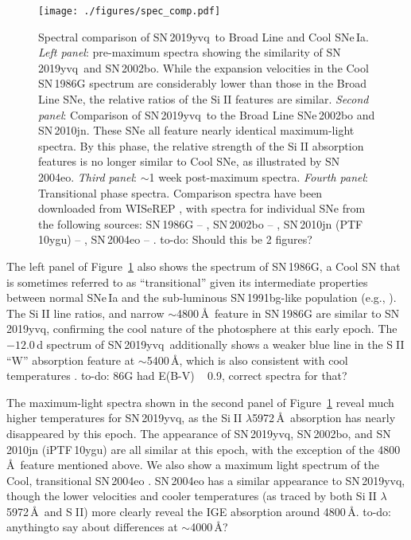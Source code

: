 \documentclass[twocolumn]{aastex63}
\def\ion#1#2{#1$\;${\footnotesize\rm{#2}}\relax}
\newcommand{\todo}[1]{{\color{magenta} to-do: {#1}}}
\newcommand{\sn}{SN\,2019yvq}
\begin{document}
\begin{figure}
    \centering
    \texttt{[image: ./figures/spec\_comp.pdf]}
    \caption{Spectral comparison of \sn\ to \citet{Branch06} Broad Line and
    Cool SNe\,Ia. \textit{Left panel}: pre-maximum spectra showing the
    similarity of \sn\ and SN\,2002bo. While the expansion velocities in the
    Cool SN\,1986G spectrum are considerably lower than those in the Broad
    Line SNe, the relative ratios of the \ion{Si}{II} features are similar.
    \textit{Second panel}: Comparison of \sn\ to the Broad Line SNe\,2002bo
    and SN\,2010jn. These SNe all feature nearly identical maximum-light
    spectra. By this phase, the relative strength of the \ion{Si}{II}
    absorption features is no longer similar to \citet{Branch06} Cool SNe, as
    illustrated by SN\,2004eo. \textit{Third panel}: $\sim$1 week post-maximum
    spectra. \textit{Fourth panel}: Transitional phase spectra. Comparison
    spectra have been downloaded from WISeREP \citep{Yaron12}, with spectra
    for individual SNe from the following sources: SN\,1986G --
    \citet{Cristiani92}, SN\,2002bo -- \citet{Benetti04,Silverman11},
    SN\,2010jn (PTF\,10ygu) -- \citet{Hachinger13,Maguire14}, SN\,2004eo --
    \citet{Pastorello07}. \todo{Should this be 2 figures?}}
    \label{fig:spec_comp}
\end{figure}

The left panel of Figure~\ref{fig:spec_comp} also shows the spectrum of
SN\,1986G, a \citet{Branch06} Cool SN that is sometimes referred to as
``transitional'' given its intermediate properties between normal SNe\,Ia and
the sub-luminous SN\,1991bg-like population (e.g., \citealt{Pastorello07}).
The \ion{Si}{II} line ratios, and narrow $\sim$4800\,\AA\ feature in SN\,1986G
are similar to \sn, confirming the cool nature of the photosphere at this
early epoch. The $-12.0$\,d spectrum of \sn\ additionally shows a weaker blue
line in the \ion{S}{II} ``W'' absorption feature at $\sim$5400\,\AA, which is
also consistent with cool temperatures \citep{Nugent95}. \todo{86G had E(B-V)
~ 0.9, correct spectra for that?}

The maximum-light spectra shown in the second panel of
Figure~\ref{fig:spec_comp} reveal much higher temperatures for \sn, as the
\ion{Si}{II} $\lambda$5972\,\AA\ absorption has nearly disappeared by this
epoch. The appearance of \sn, SN\,2002bo, and SN\,2010jn (iPTF\,10ygu) are all
similar at this epoch, with the exception of the 4800\,\AA\ feature mentioned
above. We also show a maximum light spectrum of the \citet{Branch06} Cool,
transitional SN\,2004eo \citep{Pastorello07}. SN\,2004eo has a similar
appearance to \sn, though the lower velocities and cooler temperatures (as
traced by both \ion{Si}{II} $\lambda$5972\,\AA\ and \ion{S}{II}) more clearly
reveal the IGE absorption around 4800\,\AA. \todo{anythingto say about
differences at $\sim$4000\,\AA?}
\end{document}
